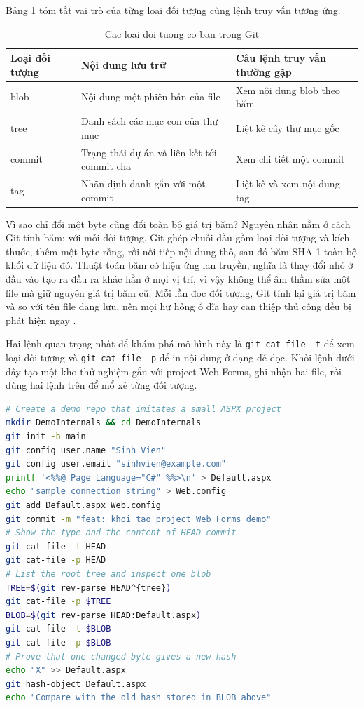 Bảng \ref{tab:c31-object} tóm tắt vai trò của từng loại đối tượng cùng lệnh truy vấn tương ứng.

\begin{table}[H]
\centering
\caption{Cac loai doi tuong co ban trong Git}
\label{tab:c31-object}
\begin{tabular}{lll}
\toprule
Loại đối tượng & Nội dung lưu trữ & Câu lệnh truy vấn thường gặp \\
\midrule
blob & Nội dung một phiên bản của file & Xem nội dung blob theo băm \\
tree & Danh sách các mục con của thư mục & Liệt kê cây thư mục gốc \\
commit & Trạng thái dự án và liên kết tới commit cha & Xem chi tiết một commit \\
tag & Nhãn định danh gắn với một commit & Liệt kê và xem nội dung tag \\
\bottomrule
\end{tabular}
\end{table}

Vì sao chỉ đổi một byte cũng đổi toàn bộ giá trị băm? Nguyên nhân nằm ở cách Git tính băm: với mỗi đối tượng, Git ghép chuỗi đầu gồm loại đối tượng và kích thước, thêm một byte rỗng, rồi nối tiếp nội dung thô, sau đó băm SHA-1 toàn bộ khối dữ liệu đó.
Thuật toán băm có hiệu ứng lan truyền, nghĩa là thay đổi nhỏ ở đầu vào tạo ra đầu ra khác hẳn ở mọi vị trí, vì vậy không thể âm thầm sửa một file mà giữ nguyên giá trị băm cũ.
Mỗi lần đọc đối tượng, Git tính lại giá trị băm và so với tên file đang lưu, nên mọi hư hỏng ổ đĩa hay can thiệp thủ công đều bị phát hiện ngay \cite{progit}.

Hai lệnh quan trọng nhất để khám phá mô hình này là \verb|git cat-file -t| để xem loại đối tượng và \verb|git cat-file -p| để in nội dung ở dạng dễ đọc.
Khối lệnh dưới đây tạo một kho thử nghiệm gắn với project Web Forms, ghi nhận hai file, rồi dùng hai lệnh trên để mổ xẻ từng đối tượng.

\begin{lstlisting}[language=bash]
# Create a demo repo that imitates a small ASPX project
mkdir DemoInternals && cd DemoInternals
git init -b main
git config user.name "Sinh Vien"
git config user.email "sinhvien@example.com"
printf '<%%@ Page Language="C#" %%>\n' > Default.aspx
echo "sample connection string" > Web.config
git add Default.aspx Web.config
git commit -m "feat: khoi tao project Web Forms demo"
# Show the type and the content of HEAD commit
git cat-file -t HEAD
git cat-file -p HEAD
# List the root tree and inspect one blob
TREE=$(git rev-parse HEAD^{tree})
git cat-file -p $TREE
BLOB=$(git rev-parse HEAD:Default.aspx)
git cat-file -t $BLOB
git cat-file -p $BLOB
# Prove that one changed byte gives a new hash
echo "X" >> Default.aspx
git hash-object Default.aspx
echo "Compare with the old hash stored in BLOB above"
\end{lstlisting}

